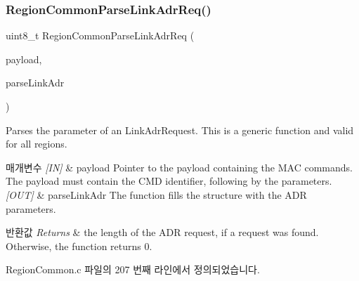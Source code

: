 \subsubsection{\texorpdfstring{Region\+Common\+Parse\+Link\+Adr\+Req()}{RegionCommonParseLinkAdrReq()}}
{\footnotesize\ttfamily uint8\+\_\+t Region\+Common\+Parse\+Link\+Adr\+Req (\begin{DoxyParamCaption}\item[{uint8\+\_\+t $\ast$}]{payload,  }\item[{\mbox{\hyperlink{group___r_e_g_i_o_n_c_o_m_m_o_n_ga6e1aaa6b8d179e2daffac8d1e23d7f24}{Region\+Common\+Link\+Adr\+Params\+\_\+t}} $\ast$}]{parse\+Link\+Adr }\end{DoxyParamCaption})}



Parses the parameter of an Link\+Adr\+Request. This is a generic function and valid for all regions. 


\begin{DoxyParams}{매개변수}
{\em \mbox{[}\+I\+N\mbox{]}} & payload Pointer to the payload containing the M\+AC commands. The payload must contain the C\+MD identifier, following by the parameters.\\
\hline
{\em \mbox{[}\+O\+U\+T\mbox{]}} & parse\+Link\+Adr The function fills the structure with the A\+DR parameters.\\
\hline
\end{DoxyParams}

\begin{DoxyRetVals}{반환값}
{\em Returns} & the length of the A\+DR request, if a request was found. Otherwise, the function returns 0. \\
\hline
\end{DoxyRetVals}


Region\+Common.\+c 파일의 207 번째 라인에서 정의되었습니다.


